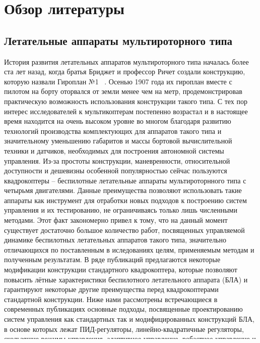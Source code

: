 

\chapter{Обзор литературы} \label{review}
\section{Летательные аппараты мультироторного типа} \label{review_s1}

История развития летательных аппаратов мультироторного типа началась более ста лет назад, когда братья Бриджет и профессор Ричет создали конструкцию, которую назвали Гироплан №1 ~\cite{Leishman02, Leishman01}. Осенью 1907 года их гироплан вместе с пилотом на борту оторвался от земли менее чем на метр, продемонстрировав практическую возможность использования конструкции такого типа. С тех пор интерес исследователей к мультикоптерам постепенно возрастал и в настоящее время находится на очень высоком уровне во многом благодаря развитию технологий производства комплектующих для аппаратов такого типа и значительному уменьшению габаритов и массы бортовой вычислительной техники и датчиков, необходимых для построения автономной системы управления. Из-за простоты конструкции, маневренности, относительной доступности и дешевизны особенной популярностью сейчас пользуются квадрокоптеры -- беспилотные летательные аппараты мультироторнного типа с четырьмя двигателями. Данные преимущества позволяют использовать такие аппараты как инструмент для отработки новых подходов к построению систем управления и их тестированию, не ограничиваясь только лишь численными методами. Этот факт закономерно привел к тому, что на данный момент существует достаточно большое количество работ, посвященных управляемой динамике беспилотных летательных аппаратов такого типа, значительно отличающихся по поставленным в иследованиях целям, применяемым методам и полученным результатам. В ряде публикаций предлагаются некоторые модификации конструкции стандартного квадрокоптера, которые позволяют повысить лётные характеристики беспилотного летательного аппарата (БЛА) и гарантируют некоторые другие преимущества перед квадрокоптерами стандартной конструкции. Ниже нами рассмотрены встречающиеся в современных публикациях основные подходы, посвященные проектированию систем управления как стандартных так и модифицированных конструкций БЛА, в основе которых лежат ПИД-регуляторы, линейно-квадратичные регуляторы, скользящие режимы управления, адаптивное управление, робастное управление и другие методы современной теории управления.

